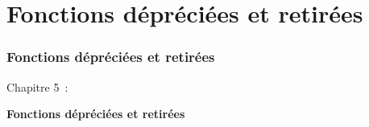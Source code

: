 %

\section{Fonctions dépréciées et retirées}
\begin{frame}[fragile]
	\frametitle{Fonctions dépréciées et retirées}

	\begin{center}\huge{Chapitre 5~:}\end{center}
	\begin{center}\huge{\color{typo3darkgrey}\textbf{Fonctions dépréciées et retirées}}\end{center}

\end{frame}



